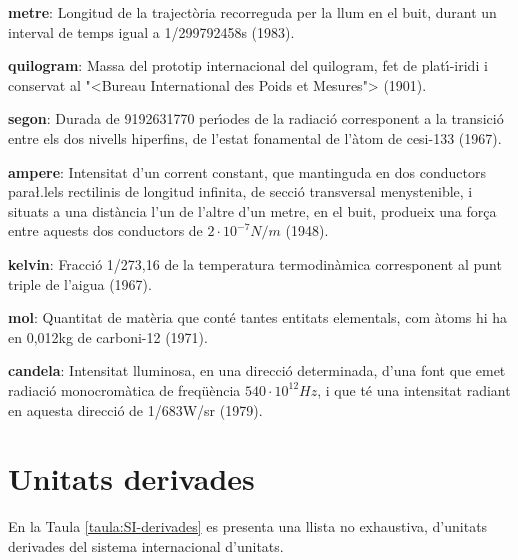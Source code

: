 \begin{list}{}
   {\setlength{\labelwidth}{22mm} \setlength{\leftmargin}{22mm} \setlength{\labelsep}{2mm}}
   \item[\textbf{metre}:] Longitud de la traject\`{o}ria recorreguda per la llum
   en el buit, durant un interval de temps igual a 1/299792458\unit{s} (1983).
   \item[\textbf{quilogram}:] Massa del prototip internacional del quilogram, fet de plat\'{\i}-iridi i
    conservat al {"<}Bureau International des Poids et Mesures{">} (1901).
   \item[\textbf{segon}:] Durada de 9192631770 per\'{\i}odes de la
   radiaci\'{o} corresponent a la transici\'{o} entre els dos nivells
  hiperfins, de l'estat fonamental de l'\`{a}tom de cesi-133 (1967).
   \item[\textbf{ampere}:] Intensitat d'un corrent constant,
   que mantinguda en dos conductors para{\l.l}els rectilinis de longitud
   infinita, de secci\'{o} transversal menystenible, i situats a una
   dist\`{a}ncia l'un de l'altre d'un metre, en el buit, produeix una for\c{c}a entre
   aquests dos conductors de $2\cdot10^{-7}\unit{N/m}$ (1948).
   \item[\textbf{kelvin}:] Fracci\'{o} 1/273,16 de la temperatura
   termodin\`{a}mica corresponent al punt triple de l'aigua (1967).
   \item[\textbf{mol}:] Quantitat de mat\`{e}ria que cont\'{e} tantes
   entitats elementals, com \`{a}toms hi ha en 0,012\unit{kg} de carboni-12 (1971).
   \item[\textbf{candela}:] Intensitat lluminosa, en una direcci\'{o} determinada,
   d'una font que emet radiaci\'{o} monocrom\`{a}tica de freq\"{u}\`{e}ncia $540\cdot10^{12}\unit{Hz}$, i
   que t\'{e} una intensitat radiant en aquesta direcci\'{o} de 1/683\unit{W/sr} (1979).
\end{list}

\section{Unitats derivades}

En la Taula \vref{taula:SI-derivades} es presenta una llista no
exhaustiva, d'unitats derivades del sistema internacional d'unitats.

